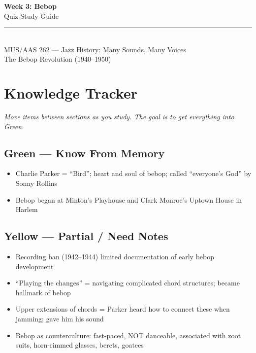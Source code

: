 \documentclass[11pt, letterpaper]{article}
\begin{document}
\thispagestyle{empty}
\begin{center}
    \vspace*{0.5cm}
    {\Huge\bfseries\color{accent} Week 3: Bebop}\\[0.5em]
    {\Large\color{subaccent} Quiz Study Guide}\\[1em]
    \textcolor{rulecolor}{\rule{0.6\textwidth}{0.8pt}}\\[0.8em]
    {\color{gray}\small MUS/AAS 262 --- Jazz History: Many Sounds, Many Voices\\[0.3em]
    The Bebop Revolution (1940--1950)}
    \vspace{1cm}
\end{center}

\tableofcontents
\newpage

\section{Knowledge Tracker}

\textit{Move items between sections as you study. The goal is to get everything into Green.}

\subsection*{\textcolor{greenzone}{Green --- Know From Memory}}
\begin{itemize}[label=$\square$]
    \item Charlie Parker = ``Bird''; heart and soul of bebop; called ``everyone's God'' by Sonny Rollins
    \item Bebop began at Minton's Playhouse and Clark Monroe's Uptown House in Harlem
\end{itemize}

\subsection*{\textcolor{yellowzone}{Yellow --- Partial / Need Notes}}
\begin{itemize}[label=$\square$]
    \item Recording ban (1942--1944) limited documentation of early bebop development
    \item ``Playing the changes'' = navigating complicated chord structures; became hallmark of bebop
    \item Upper extensions of chords = Parker heard how to connect these when jamming; gave him his sound
    \item Bebop as counterculture: fast-paced, NOT danceable, associated with zoot suits, horn-rimmed glasses, berets, goatees
\end{itemize}
\end{document}
